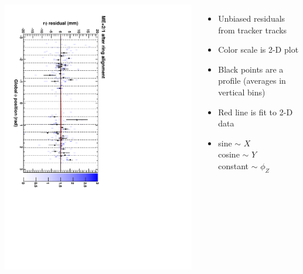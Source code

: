 \documentclass[compress]{beamer}
\begin{document}
\begin{frame}
\begin{columns}
\includegraphics[height=\linewidth, angle=90]{ringfits_after/mep21.pdf}
\begin{itemize}
\item Unbiased residuals from tracker tracks
\item Color scale is 2-D plot
\item Black points are a profile (averages in vertical bins)
\item Red line is fit to 2-D data
\item sine $\sim$ $X$ \\
cosine $\sim$ $Y$ \\
constant $\sim$ $\phi_Z$
\end{itemize}
\end{columns}
\end{frame}
\end{document}
